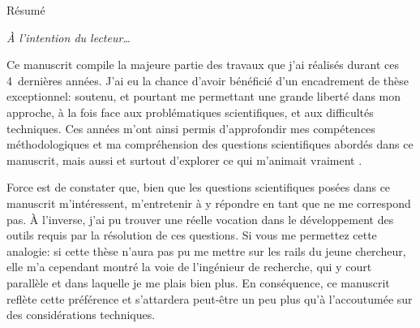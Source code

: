 
\thispagestyle{thesis-empty}

Résumé

\begin{comment}

\clearpage
\thispagestyle{thesis-empty}

\section*{Remerciements}
\label{sec:thanks}

la colloc étendu: théo, thomas, arthur, rémi, rémy, clément, sarah
parler du confinement ?
les potos: benjamin, marie, charlie, paul, jessie, piwi

la mifa

mon comité de thèse ? Sakina, Daniele

le 426 le meilleur bureau, tous les autres doctorants et post-doctorants et stagiaires
c'est quand même vachement plus fun avec elleux.

l'équipe admin du labo, bigup
\end{comment}

\clearpage
\thispagestyle{thesis-empty}

\vspace*{5ex}
\par\addvspace{\beforesecskip}\addvspace{\baselineskip}
\par\noindent\textit{À l'intention du lecteur\dots}\par
\vspace{\aftersecskip}

Ce manuscrit compile la majeure partie des travaux que j'ai réalisés durant ces 4~dernières années.
J'ai eu la chance d'avoir bénéficié d'un encadrement de thèse exceptionnel: soutenu, et pourtant me permettant une grande liberté dans mon approche, à la fois face aux problématiques scientifiques, et aux difficultés techniques.
Ces années m'ont ainsi permis d'approfondir mes compétences méthodologiques et ma compréhension des questions scientifiques abordés dans ce manuscrit, mais aussi et surtout d'explorer ce qui m'animait vraiment .

Force est de constater que, bien que les questions scientifiques posées dans ce manuscrit m'intéressent, m'entretenir à y répondre en tant que  ne me correspond pas.
À l'inverse, j'ai pu trouver une réelle vocation dans le développement des outils requis par la résolution de ces questions.
Si vous me permettez cette analogie: si cette thèse n'aura pas pu me mettre sur les rails du jeune chercheur, elle m'a cependant montré la voie de l'ingénieur de recherche, qui y court parallèle et dans laquelle je me plais bien plus.
En conséquence, ce manuscrit reflète cette préférence et s'attardera peut-être un peu plus qu'à l'accoutumée sur des considérations techniques.

